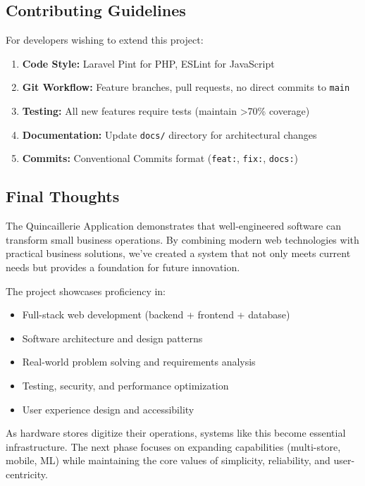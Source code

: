 \subsection{Contributing Guidelines}

For developers wishing to extend this project:

\begin{enumerate}
    \item \textbf{Code Style:} Laravel Pint for PHP, ESLint for JavaScript
    \item \textbf{Git Workflow:} Feature branches, pull requests, no direct commits to \texttt{main}
    \item \textbf{Testing:} All new features require tests (maintain >70\% coverage)
    \item \textbf{Documentation:} Update \texttt{docs/} directory for architectural changes
    \item \textbf{Commits:} Conventional Commits format (\texttt{feat:}, \texttt{fix:}, \texttt{docs:})
\end{enumerate}

\subsection{Final Thoughts}

The Quincaillerie Application demonstrates that well-engineered software can transform small business operations. By combining modern web technologies with practical business solutions, we've created a system that not only meets current needs but provides a foundation for future innovation.

The project showcases proficiency in:
\begin{itemize}
    \item Full-stack web development (backend + frontend + database)
    \item Software architecture and design patterns
    \item Real-world problem solving and requirements analysis
    \item Testing, security, and performance optimization
    \item User experience design and accessibility
\end{itemize}

As hardware stores digitize their operations, systems like this become essential infrastructure. The next phase focuses on expanding capabilities (multi-store, mobile, ML) while maintaining the core values of simplicity, reliability, and user-centricity.

